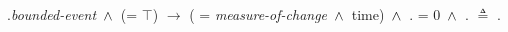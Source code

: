 \ex.\label{constr:duration}\textit{bounded-event} $\,\wedge\,$ (\DURATION = $\top$) $\rightarrow$ ({\scshape\MDIM} = \textit{measure-of-change} $\,\wedge\,$ time) $\,\wedge\,$  {\scshape\MDIM} . \MIN = 0 $\,\wedge\,$ {\scshape\MDIM} . \MAX $\triangleq$ \DURATION .\VAL




